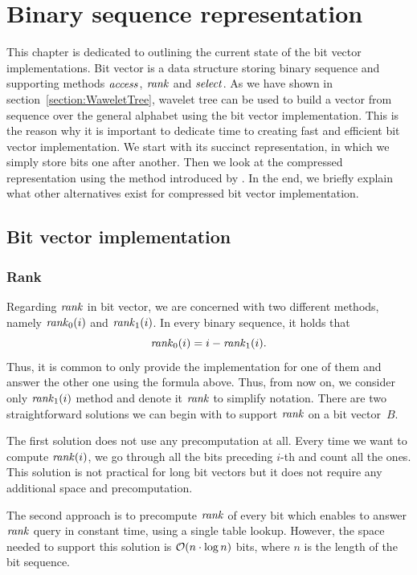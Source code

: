 \chapter{Binary sequence representation}
\label{kap:kap2}

This chapter is dedicated to outlining the current state of the bit vector
implementations. Bit vector is a data structure storing binary sequence and supporting
methods $\mathit{access}$, $\mathit{rank}$ and $\mathit{select}$. As we have shown in section~\ref{section:WaweletTree},
wavelet tree can be used to build a vector from sequence over the general alphabet
using the bit vector implementation. This is the reason why it is important to dedicate
time to creating fast and efficient bit vector implementation. We start with its
succinct representation, in which we simply store bits one after another. Then we
look at the compressed representation using the method introduced by \cite{raman2007succinct}.
In the end, we briefly explain what other alternatives exist for compressed bit vector
implementation.

\section{Bit vector implementation}

\subsection{Rank}
\label{section:rank}

Regarding $\mathit{rank}$ in bit vector, we are concerned with two different methods, namely $\mathit{rank}_0(i)$
and $\mathit{rank}_1(i)$. In every binary sequence, it holds that $$\mathit{rank}_0(i) = i - \mathit{rank}_1(i).$$
Thus, it is common to only provide the implementation for one of them and answer the other one
using the formula above. Thus, from now on, we consider only $\mathit{rank}_1(i)$ method and denote
it $\mathit{rank}$ to simplify notation. There are two straightforward solutions we can begin with to
support $\mathit{rank}$ on a bit vector~$B$.

The first solution does not use any precomputation at all. Every time we want
to compute $\mathit{rank}(i)$, we go through all the bits preceding $i$-th and count all
the ones. This solution is not practical for long bit vectors but it does not require
any additional space and precomputation.

The second approach is to precompute $\mathit{rank}$ of every bit which enables to answer
$\mathit{rank}$ query in constant time, using a single table lookup. However, the space needed to
support this solution is $\mathcal{O}(n\cdot\log n)$ bits, where $n$ is the length of the
bit sequence.

